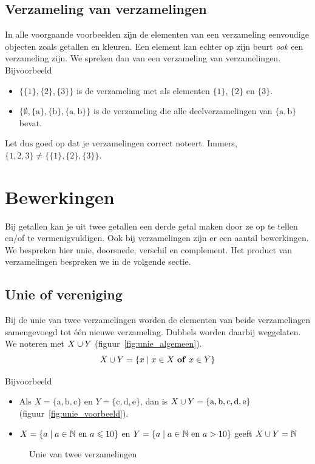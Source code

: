 \subsection{Verzameling van verzamelingen}
In alle voorgaande voorbeelden zijn de elementen van een verzameling eenvoudige objecten zoals getallen en kleuren. Een element kan echter op zijn beurt \emph{ook} een verzameling zijn. We spreken dan van een verzameling van verzamelingen. Bijvoorbeeld
\begin{itemize}
  \item $\{\{1\},\{2\},\{3\} \}$ is de verzameling met als elementen $\{1\}$, $\{2\}$ en $\{3\}$.
  \item $\{ \emptyset, \{\mathrm{a}\}, \{\mathrm{b}\}, \{\mathrm{a},\mathrm{b}\}\}$ is de verzameling die alle deelverzamelingen van $\{ \mathrm{a},\mathrm{b}\}$ bevat.
\end{itemize}
Let dus goed op dat je verzamelingen correct noteert. 
Immers,\\ $\{1,2,3 \}\not = \{\{ 1\},\{2 \},\{3 \} \}$.



\newpage
\section{Bewerkingen}
Bij getallen kan je  uit twee getallen een derde getal maken door ze  op te tellen en/of te  vermenigvuldigen. Ook bij verzamelingen zijn er een aantal bewerkingen. We bespreken hier unie, doorsnede, verschil en complement. Het product van verzamelingen bespreken we in de volgende sectie.

\subsection{Unie of vereniging}\index{\ensuremath{\union}}
Bij de unie van twee verzamelingen worden de elementen van beide verzamelingen samengevoegd tot \'e\'en nieuwe verzameling. Dubbels worden daarbij weggelaten. We noteren met $X \cup Y$ (figuur~\ref{fig:unie_algemeen}). 
\begin{equation*}
X \cup Y =\{x \mid x\in X ~\mathbf{of}~x\in Y \}
\end{equation*}

Bijvoorbeeld
\begin{itemize}
\item Als $X=\{\mathrm{a},\mathrm{b},\mathrm{c}\}$ en $Y=\{\mathrm{c},\mathrm{d},\mathrm{e}\}$, dan is $X\cup Y=\{\mathrm{a},\mathrm{b},\mathrm{c},\mathrm{d},\mathrm{e}\}$ (figuur~\ref{fig:unie_voorbeeld}).
\item $X=\{a \mid a\in \mathbb{N} ~\mathrm{en}~a\leqslant 10\}$ en $Y=\{a \mid a\in \mathbb{N} ~\mathrm{en}~a>10\}$ geeft $X\cup Y=\mathbb{N}$
\end{itemize}
\begin{figure}[htbp]
\centering
{}\qquad
{}
\caption{Unie van twee verzamelingen}
\end{figure}


